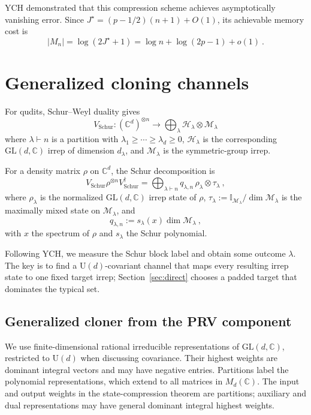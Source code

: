 \documentclass[a4paper,onecolumn,11pt]{quantumarticle}
\def\h{\mathcal{H}}
\def\id{\mathbb{I}}
\def\map{\mathcal}
\begin{document}
YCH demonstrated that this compression scheme achieves asymptotically vanishing error. Since $J^\star=(p-1/2)(n+1)+O(1)$, its achievable memory cost is
\begin{equation}\label{eq:achievable_qubit}
    |M_n|=\log (2J^\star+1) = \log n + \log (2p-1) + o(1)\ .
\end{equation}


\section{Generalized cloning channels}\label{sec:cloner}

For qudits, Schur--Weyl duality gives
\begin{equation}
    V_\mathrm{Schur}: (\mathbb C^d)^{\otimes n}\to\bigoplus_\lambda\h_\lambda\otimes\map{M}_\lambda
\end{equation}
where $\lambda\vdash n$ is a partition with
$\lambda_1\ge\cdots\ge\lambda_d\ge0$,
$\h_\lambda$ is the corresponding $\mathrm{GL}(d,\mathbb C)$ irrep
of dimension $d_\lambda$, and $\map M_\lambda$ is the symmetric-group irrep.

For a density matrix $\rho$ on $\mathbb{C}^d$, the Schur decomposition is
\begin{equation}\label{eq:schur_d}
    V_\mathrm{Schur}\rho^{\otimes n}V_\mathrm{Schur}^\dagger
    = \bigoplus_{\lambda\vdash n} q_{\lambda,n}\,
    \rho_\lambda\otimes\tau_\lambda\ ,
\end{equation}
where $\rho_\lambda$ is the normalized $\mathrm{GL}(d,\mathbb{C})$ irrep
state of $\rho$, $\tau_\lambda:=\id_{\map M_\lambda}/\dim\map M_\lambda$
is the maximally mixed state on $\map M_\lambda$, and
\begin{equation}\label{eq:qlambda_def}
    q_{\lambda,n} := s_\lambda(x)\dim\map{M}_\lambda\ ,
\end{equation}
with $x$ the spectrum of $\rho$ and $s_\lambda$ the Schur polynomial.

Following YCH, we measure the Schur block label and obtain some outcome $\lambda$. The key is to find a $\mathrm{U}(d)$-covariant channel that maps every resulting irrep state to one fixed target irrep; Section~\ref{sec:direct} chooses a padded target that dominates the typical set.


\subsection{Generalized cloner from the PRV component}\label{sec:definition}
We use finite-dimensional rational irreducible representations of
$\mathrm{GL}(d,\mathbb C)$, restricted to $\mathrm U(d)$ when discussing
covariance. Their highest weights are dominant integral vectors and may
have negative entries. Partitions label the polynomial representations,
which extend to all matrices in $M_d(\mathbb C)$. The input and output
weights in the state-compression theorem are partitions; auxiliary and
dual representations may have general dominant integral highest weights.
\end{document}

